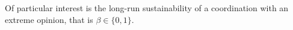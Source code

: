 \documentclass[letterpaper,11pt]{article}
\newcommand{\EE}{\mathsf{E}}
\newcommand{\nsf}{\mathsf{N}}
\newcommand{\cost}{\mathsf{cost}}
\newcommand{\degsf}{\mathsf{deg}}
\newcommand{\vvcom}[1]{\todo[color=red!25!white]{Victor: #1}}
\begin{document}
 Of particular interest is the long-run sustainability of a coordination with an extreme opinion, that is $\beta\in \{0,1\}$.
\end{document}
